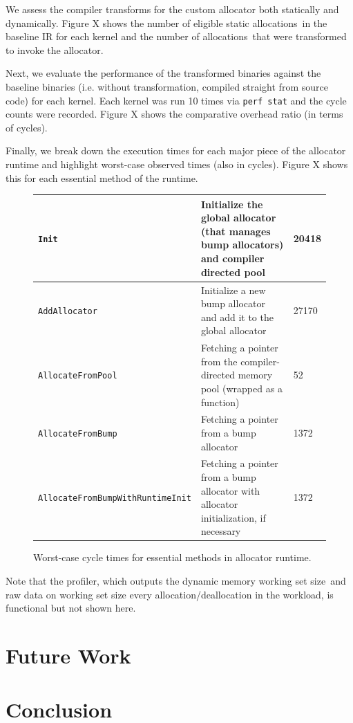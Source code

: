 \documentclass{article}
\def\ALLS{allocations}
\def\DWS{dynamic memory working set size}
\begin{document}
We assess the compiler transforms for the custom allocator both statically and dynamically. Figure X
shows the number of eligible static \ALLS\ in the baseline IR for each kernel and the number of \ALLS\
that were transformed to invoke the allocator. 

Next, we evaluate the performance of the transformed binaries against the baseline binaries (i.e.
without transformation, compiled straight from source code) for each kernel. Each kernel was 
run 10 times via \texttt{perf stat} and the cycle counts were recorded. Figure X shows the comparative
overhead ratio (in terms of cycles).

Finally, we break down the execution times for each major piece of the allocator runtime and
highlight worst-case observed times (also in cycles). Figure X shows this for each essential
method of the runtime. 

\begin{figure}
        \small
        \centering
        \begin{tabular}{ | m{5cm} | m{9cm} | m{3cm} | } 
          \hline
            \texttt{Init} & Initialize the global allocator (that manages bump allocators) and compiler directed pool & 20418 \\ 
          \hline
            \texttt{AddAllocator} & Initialize a new bump allocator and add it to the global allocator & 27170 \\ 
          \hline
            \texttt{AllocateFromPool} & Fetching a pointer from the compiler-directed memory pool (wrapped as a function) & 52 \\ 
          \hline
            \texttt{AllocateFromBump} & Fetching a pointer from a bump allocator & 1372 \\ 
          \hline
            \texttt{AllocateFromBumpWithRuntimeInit} & Fetching a pointer from a bump allocator with allocator initialization, if necessary & 1372 \\ 
          \hline
        \end{tabular}
        \caption{Worst-case cycle times for essential methods in allocator runtime.}
        \label{fig:apps}
\end{figure}


Note that the profiler, which outputs the \DWS\ and raw data on working set size 
every allocation/deallocation in the workload, is functional but not shown here. 


\section{Future Work}

\section{Conclusion}



\end{document}
